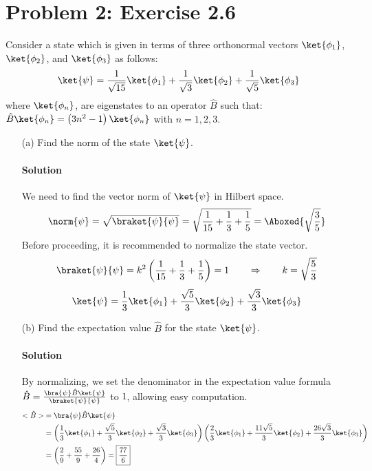 \documentclass{article}
\begin{document}
	\section*{Problem 2: Exercise 2.6}
	Consider a state which is given in terms of three orthonormal vectors $\ket{\phi_1}$, $\ket{\phi_2}$, and $\ket{\phi_3}$ as follows:
	\[
		\ket{\psi} = \frac{1}{\sqrt{15}} \ket{\phi_1} + \frac{1}{\sqrt{3}} \ket{\phi_2} + \frac{1}{\sqrt{5}} \ket{\phi_3}
	\]
	where $\ket{\phi_n}$, are eigenstates to an operator $\hat{B}$ such that: $\hat{B}\ket{\phi_n} = \left( 3n^2 - 1 \right)\ket{\phi_n}$ with $n=1,2,3$.
	\begin{enumerate}
		\item[(a)] Find the norm of the state $\ket{\psi}$.
		\paragraph{Solution} We need to find the vector norm of $\ket{\psi}$ in Hilbert space.
		\begin{align*}
			\norm{\psi} = \sqrt{\braket{\psi}{\psi}} = \sqrt{\frac{1}{15} + \frac{1}{3} + \frac{1}{5}} = \Aboxed{\sqrt{\frac{3}{5}}}
		\end{align*}
		Before proceeding, it is recommended to normalize the state vector.
		\[
			\braket{\psi}{\psi} = k^2 \left( \frac{1}{15} + \frac{1}{3} + \frac{1}{5} \right) = 1 \qquad \Rightarrow \qquad k = \sqrt{\frac{5}{3}}
		\]
		\[
			\ket{\psi} = \frac{1}{3} \ket{\phi_1} + \frac{\sqrt{5}}{3} \ket{\phi_2} + \frac{\sqrt{3}}{3} \ket{\phi_3}
		\]
		
		\item[(b)] Find the expectation value $\hat{B}$ for the state $\ket{\psi}$.
		\paragraph{Solution} By normalizing, we set the denominator in the expectation value formula $\hat{B} = \frac{\bra{\psi}\hat{B}\ket{\psi}}{\braket{\psi}{\psi}}$ to $1$, allowing easy computation.
		\begin{align*}
			<\hat{B}> &= \bra{\psi}\hat{B}\ket{\psi} \\
			&= \left( \frac{1}{3} \ket{\phi_1} + \frac{\sqrt{5}}{3} \ket{\phi_2} + \frac{\sqrt{3}}{3} \ket{\phi_3} \right) \left( \frac{2}{3} \ket{\phi_1} + \frac{11\sqrt{5}}{3} \ket{\phi_2} + \frac{26\sqrt{3}}{3} \ket{\phi_3} \right) \\
			&= \left( \frac{2}{9} + \frac{55}{9} + \frac{26}{4} \right) = \boxed{\frac{77}{6}}
		\end{align*}
		

\end{enumerate}
\end{document}
